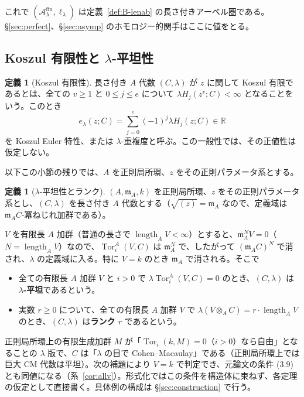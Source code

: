 \documentclass[11pt,a4paper]{ltjsarticle}
\numberwithin{equation}{section}
\theoremstyle{plain}
\theoremstyle{definition}
\newtheorem{definition}[theorem]{定義}
\theoremstyle{definition}
\newcommand{\m}{\mathfrak{m}}
\newcommand{\Tor}{\operatorname{Tor}}
\newcommand{\len}{\operatorname{length}}
\newcommand{\R}{\mathbb{R}}
\begin{document}
これで $(\mathcal{A}_\lambda^{\mathrm{fin}},\ell_\lambda)$ は定義~\ref{def:B-lenab} の長さ付きアーベル圏である。§\ref{sec:perfect}、§\ref{sec:asymp} のホモロジー的関手はここに値をとる。

\subsection{Koszul 有限性と $\lambda$-平坦性}\label{sec:length-koszul}\label{sec:planC-general}

\begin{definition}[Koszul 有限性]\label{def:C-levels}
長さ付き $A$ 代数 $(C,\lambda)$ が $z$ に関して Koszul 有限であるとは、全ての $v\ge1$ と $0\le j\le e$ について $\lambda H_j(z^v;C)<\infty$ となることをいう。このとき
\[
 e_\lambda(z;C)=\sum_{j=0}^e(-1)^j\lambda H_j(z;C)\in\R
\]
を Koszul Euler 特性、または $\lambda$-重複度と呼ぶ。この一般性では、その正値性は仮定しない。
\end{definition}

以下この小節の残りでは、$A$ を正則局所環、$z$ をその正則パラメータ系とする。

\begin{definition}[$\lambda$-平坦性とランク]\label{def:lengthalg}
$(A,\m_A,k)$ を正則局所環、$z$ をその正則パラメータ系とし、$(C,\lambda)$ を長さ付き $A$ 代数とする（$\sqrt{(z)}=\m_A$ なので、定義域は $\m_A C$-冪ねじれ加群である）。

$V$ を有限長 $A$ 加群（普通の長さで $\len_A V<\infty$）とすると、$\m_A^N V = 0$（$N = \len_A V$）なので、$\Tor_i^A(V,C)$ は $\m_A^N$ で、したがって $(\m_A C)^N$ で消され、$\lambda$ の定義域に入る。特に $V = k$ のとき $\m_A$ で消される。そこで
\begin{itemize}
  \item 全ての有限長 $A$ 加群 $V$ と $i>0$ で $\lambda\Tor_i^A(V,C) = 0$ のとき、$(C,\lambda)$ は \textbf{$\lambda$-平坦}であるという。
  \item 実数 $r\ge 0$ について、全ての有限長 $A$ 加群 $V$ で $\lambda(V\otimes_A C) = r\cdot\len_A V$ のとき、$(C,\lambda)$ は\textbf{ランク $r$} であるという。
\end{itemize}
\end{definition}
正則局所環上の有限生成加群 $M$ が「$\Tor_i(k,M) = 0$（$i>0$）なら自由」となることの $\lambda$ 版で、$C$ は「$\lambda$ の目で Cohen--Macaulay」である（正則局所環上では巨大 CM 代数は平坦）。次の補題により $V = k$ で判定でき、元論文の条件 (3.9) とも同値になる（系~\ref{cor:allv}）。形式化ではこの条件を構造体に束ねず、各定理の仮定として直接書く。具体例の構成は §\ref{sec:construction} で行う。
\end{document}
